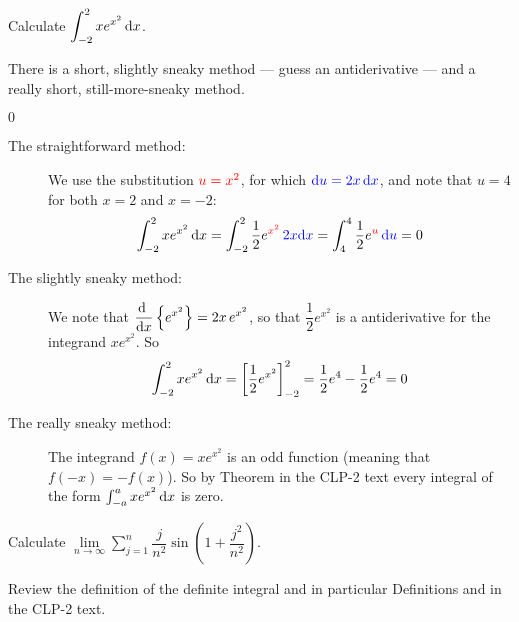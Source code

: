 \begin{question}[2016A]
Calculate $\displaystyle\int_{-2}^2 xe^{x^2}\,\mathrm{d}x$.
\end{question}

\begin{hint}
There is a short, slightly sneaky method --- guess an antiderivative ---
and a really short, still-more-sneaky method.
\end{hint}

\begin{answer}
$0$
\end{answer}

\begin{solution}
\begin{description}
\item[The straightforward method:]
We use the substitution $\textcolor{red}{u=x^2}$, for which $\textcolor{blue}{\mathrm{d}u=2x\,\mathrm{d}x}$, and note that
$u=4$ for both $x=2$ and $x=-2$:
\begin{align*}
\int_{-2}^2 xe^{x^2}\,\mathrm{d}x
=\int_{-2}^2 \frac{1}{2}e^{\textcolor{red}{x^2}}\,\textcolor{blue}{2x\mathrm{d}x} 
= \int_4^4 \frac{1}{2}e^{\textcolor{red}{u}}\,\textcolor{blue}{\mathrm{d}u}
=0
\end{align*}

\item[The slightly sneaky method:]
We note that $\displaystyle\diff{}{x} \left\{e^{x^2} \right\}= 2x\, e^{x^2}$, so that $\dfrac{1}{2} e^{x^2}$
is a antiderivative for the integrand $x e^{x^2}$. So
\begin{align*}
\int_{-2}^2 xe^{x^2}\,\mathrm{d}x = \bigg[\frac{1}{2}e^{x^2}\bigg]_{-2}^2
=\frac{1}{2}e^4-\frac{1}{2}e^4=0
\end{align*}


\item[The really sneaky method:]
The integrand $f(x) = x e^{x^2}$ is an odd function (meaning that $f(-x)=-f(x)$).
So by Theorem  in the  CLP-2 text every integral
of the form $\int_{-a}^a x e^{x^2}\,\mathrm{d}x$ is zero.
\end{description}
\end{solution}



\begin{question}[2000D]
Calculate $\displaystyle\lim\limits_{n\rightarrow\infty}\sum\limits_{j=1}^n
\dfrac{j}{n^2}\sin\left(1+\dfrac{j^2}{n^2}\right)$.
\end{question}

\begin{hint}
Review the definition of the definite integral and in particular
Definitions    and
                  in the
CLP-2 text.
\end{hint}

